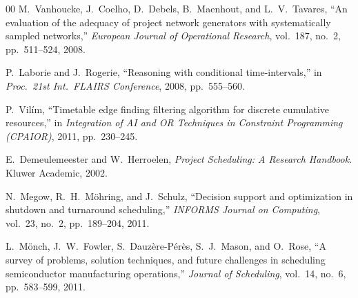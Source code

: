 \documentclass[conference]{IEEEtran}
\begin{document}
\begin{thebibliography}{00}
M.~Vanhoucke, J.~Coelho, D.~Debels, B.~Maenhout, and L.~V.~Tavares,
``An evaluation of the adequacy of project network generators with
systematically sampled networks,''
\textit{European Journal of Operational Research}, vol.~187, no.~2,
pp.~511--524, 2008.

P.~Laborie and J.~Rogerie,
``Reasoning with conditional time-intervals,''
in \textit{Proc.\ 21st Int.\ FLAIRS Conference}, 2008, pp.~555--560.

P.~Vil\'im,
``Timetable edge finding filtering algorithm for discrete cumulative
resources,''
in \textit{Integration of AI and OR Techniques in Constraint
Programming (CPAIOR)}, 2011, pp.~230--245.

E.~Demeulemeester and W.~Herroelen,
\textit{Project Scheduling: A Research Handbook}.
Kluwer Academic, 2002.

N.~Megow, R.~H.~M\"ohring, and J.~Schulz,
``Decision support and optimization in shutdown and turnaround
scheduling,''
\textit{INFORMS Journal on Computing}, vol.~23, no.~2, pp.~189--204,
2011.

L.~M\"onch, J.~W.~Fowler, S.~Dauz\`ere-P\'er\`es, S.~J.~Mason, and
O.~Rose,
``A survey of problems, solution techniques, and future challenges in
scheduling semiconductor manufacturing operations,''
\textit{Journal of Scheduling}, vol.~14, no.~6, pp.~583--599, 2011.

\end{thebibliography}
\end{document}
